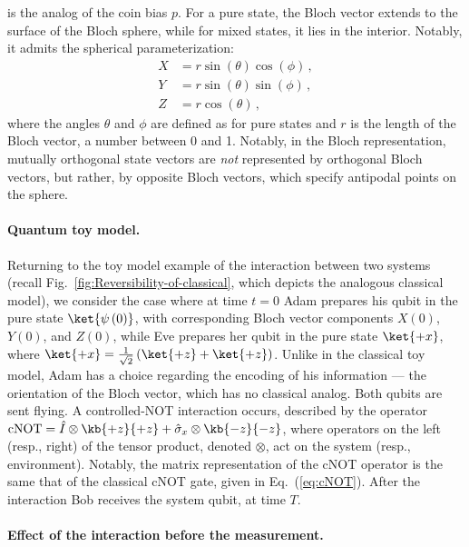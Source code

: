 is the analog of the coin bias $p$. For a pure state, the Bloch vector
extends to the surface of the Bloch sphere, while for mixed states,
it lies in the interior. Notably, it admits the spherical parameterization:
\begin{align}
X & =r\sin\left(\theta\right)\cos\left(\phi\right)\,,\nonumber \\
Y & =r\sin\left(\theta\right)\sin\left(\phi\right)\,,\nonumber \\
Z & =r\cos\left(\theta\right)\,,\label{eq:XYZBLoch}
\end{align}
where the angles $\theta$ and $\phi$ are defined as for pure states
and $r$ is the length of the Bloch vector, a number between 0 and
1. Notably, in the Bloch representation, mutually orthogonal state
vectors are \emph{not} represented by orthogonal Bloch vectors, but
rather, by opposite Bloch vectors, which specify antipodal points
on the sphere. 

\paragraph{Quantum toy model. }

Returning to the toy model example of the interaction between two
systems (recall Fig.~\ref{fig:Reversibility-of-classical}, which
depicts the analogous classical model), we consider the case where
at time $t=0$ Adam prepares his qubit in the pure state $\ket{\psi\left(0\right)}$,
with corresponding Bloch vector components $X\left(0\right)$, $Y\left(0\right)$,
and $Z\left(0\right)$, while Eve prepares her qubit in the pure state
$\ket{+x}$, where $\ket{+x}=\frac{1}{\sqrt{2}}\left(\ket{+z}+\ket{+z}\right)$.
Unlike in the classical toy model, Adam has a choice regarding the
encoding of his information — the orientation of the Bloch vector,
which has no classical analog. Both qubits are sent flying. A controlled-NOT
interaction occurs, described by the operator $\mathrm{cNOT}=\hat{I}\otimes\kb{+z}{+z}+\hat{\sigma}_{x}\otimes\kb{-z}{-z}$,
where operators on the left (resp., right) of the tensor product,
denoted $\otimes$, act on the system (resp., environment). Notably,
the matrix representation of the cNOT operator is the same that of
the classical cNOT gate, given in Eq.~(\ref{eq:cNOT}). After the
interaction Bob receives the system qubit, at time $T$. 

\paragraph{Effect of the interaction before the measurement. }

